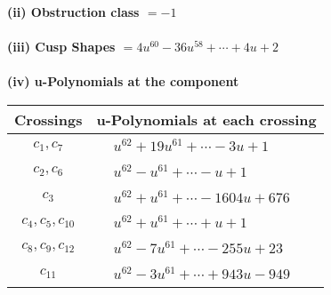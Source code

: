 \documentclass[1p]{elsarticle_modified}
\theoremstyle{definition}
\begin{document}
\flushleft \textbf{(ii) Obstruction class $= -1$}\\~\\
\flushleft \textbf{(iii) Cusp Shapes $= 4 u^{60}-36 u^{58}+\cdots+4 u+2$}\\~\\
\newpage\renewcommand{\arraystretch}{1}
\flushleft \textbf{(iv) u-Polynomials at the component}\newline \\
\begin{tabular}{m{50pt}|m{274pt}}
Crossings & \hspace{64pt}u-Polynomials at each crossing \\
\hline $$\begin{aligned}c_{1},c_{7}\end{aligned}$$&$\begin{aligned}
&u^{62}+19 u^{61}+\cdots-3 u+1
\end{aligned}$\\
\hline $$\begin{aligned}c_{2},c_{6}\end{aligned}$$&$\begin{aligned}
&u^{62}- u^{61}+\cdots- u+1
\end{aligned}$\\
\hline $$\begin{aligned}c_{3}\end{aligned}$$&$\begin{aligned}
&u^{62}+u^{61}+\cdots-1604 u+676
\end{aligned}$\\
\hline $$\begin{aligned}c_{4},c_{5},c_{10}\end{aligned}$$&$\begin{aligned}
&u^{62}+u^{61}+\cdots+u+1
\end{aligned}$\\
\hline $$\begin{aligned}c_{8},c_{9},c_{12}\end{aligned}$$&$\begin{aligned}
&u^{62}-7 u^{61}+\cdots-255 u+23
\end{aligned}$\\
\hline $$\begin{aligned}c_{11}\end{aligned}$$&$\begin{aligned}
&u^{62}-3 u^{61}+\cdots+943 u-949
\end{aligned}$\\
\hline
\end{tabular}\\~\\
\end{document}
